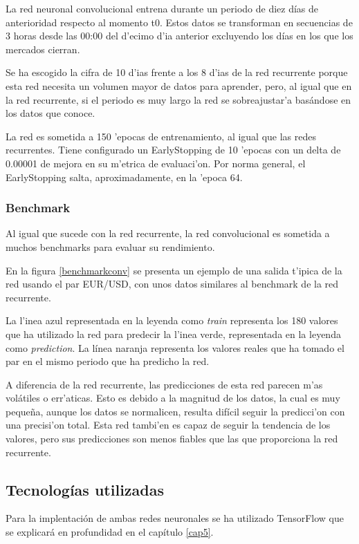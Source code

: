 La red neuronal convolucional entrena durante un periodo de diez días de anterioridad respecto al momento t0.
Estos datos se transforman en secuencias de 3 horas desde las 00:00 del d'ecimo d'ia anterior excluyendo los días en los que los mercados cierran. 

Se ha escogido la cifra de 10 d'ias frente a los 8 d'ias de la red recurrente porque esta red necesita un volumen mayor de datos para aprender, pero, al igual que en la red recurrente, si el periodo es muy largo la red se sobreajustar'a basándose en los datos que conoce. 

La red es sometida a 150 'epocas de entrenamiento, al igual que las redes recurrentes. Tiene configurado un EarlyStopping de 10 'epocas con un delta de 0.00001 de mejora en su m'etrica de evaluaci'on. Por norma general, el EarlyStopping salta, aproximadamente, en la 'epoca 64. 



\subsubsection*{Benchmark}



Al igual que sucede con la red recurrente, la red convolucional es sometida a muchos benchmarks para evaluar su rendimiento. 

En la figura \ref{benchmarkconv} se presenta un ejemplo de una salida t'ipica de la red usando el par EUR/USD, con unos datos similares al benchmark de la red recurrente. 


La l'inea azul representada en la leyenda como \textit{train} representa los 180 valores que ha utilizado la red para predecir la l'inea verde, representada en la leyenda como \textit{prediction}. La línea naranja representa los valores reales que ha tomado el par en el mismo periodo que ha predicho la red. 

A diferencia de la red recurrente, las predicciones de esta red parecen m'as volátiles o err'aticas. Esto es debido a la magnitud de los datos, la cual es muy pequeña, aunque los datos se normalicen, resulta difícil seguir la predicci'on con una precisi'on total. Esta red tambi'en es capaz de seguir la tendencia de los valores, pero sus predicciones son menos fiables que las que proporciona la red recurrente. 

\subsection{Tecnologías utilizadas}
Para la implentación de ambas redes neuronales se ha utilizado TensorFlow que se explicará en profundidad en el capítulo \ref{cap5}.


\clearpage
